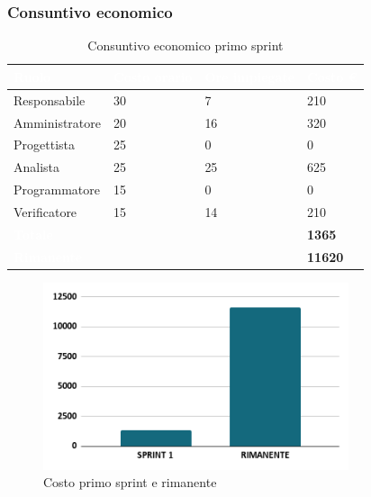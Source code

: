 \newpage
\subsubsection{Consuntivo economico}
{
\setlength{\tabcolsep}{10pt}
\renewcommand{\arraystretch}{1.5}
\begin{table}[h]
    \centering
    \begin{tabularx}{\textwidth}{| l | l | l | X |}
        \hline
        \rowcolor{headerrow} \textbf{\textcolor{white}{Ruolo}} & \textbf{\textcolor{white}{Costo orario}} & \textbf{\textcolor{white}{Ore impiegate}} & \textbf{\textcolor{white}{Costo €}} \\
        \hline
        Responsabile & 30 & 7 & 210\\
        \hline
        Amministratore & 20 & 16 & 320\\
        \hline
        Progettista& 25 & 0  & 0\\
        \hline
        Analista & 25 & 25  & 625\\
        \hline
        Programmatore & 15 & 0  & 0\\
        \hline
        Verificatore & 15 & 14  & 210\\
        \hline
        \cellcolor{headerrow} \textbf{\textcolor{white}{Totale}} &  &  & \textbf{1365}\\
        \hline
        \cellcolor{headerrow} \textbf{\textcolor{white}{Rimanente}} &  &  & \textbf{11620}\\
        \hline
    \end{tabularx}
    \caption{Consuntivo economico primo sprint}
    \label{tab:consuntivocostiprimosprint}
\end{table}
}

\begin{figure}[h!]
    \centering
    \includegraphics[width=0.8\textwidth]{cons1costo.png}
    \caption{Costo primo sprint e rimanente}
    \label{fig:consuntivocostoprimosprint}
\end{figure}

